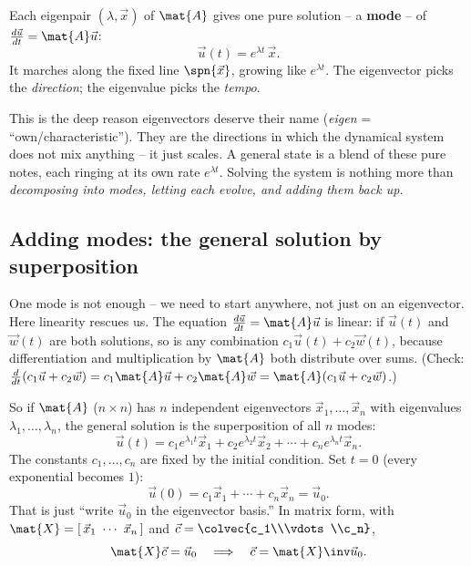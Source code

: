 \begin{focusbox}
Each eigenpair $(\lambda,\vec{x})$ of $\mat{A}$ gives one pure solution -- a
\textbf{mode} -- of $\frac{d\vec{u}}{dt}=\mat{A}\vec{u}$:
\[
  \vec{u}(t) = e^{\lambda t}\,\vec{x}.
\]
It marches along the fixed line $\spn\{\vec{x}\}$, growing like $e^{\lambda t}$.
The eigenvector picks the \emph{direction}; the eigenvalue picks the \emph{tempo}.
\end{focusbox}

\begin{intuitionbox}
This is the deep reason eigenvectors deserve their name (\emph{eigen} =
``own/characteristic''). They are the directions in which the dynamical system
does not mix anything -- it just scales. A general state is a blend of these pure
notes, each ringing at its own rate $e^{\lambda t}$. Solving the system is
nothing more than \emph{decomposing into modes, letting each evolve, and adding
them back up.}
\end{intuitionbox}

\subsection{Adding modes: the general solution by superposition}
\label{ch25:superposition}

One mode is not enough -- we need to start anywhere, not just on an eigenvector.
Here linearity rescues us. The equation $\frac{d\vec{u}}{dt} = \mat{A}\vec{u}$ is
linear: if $\vec{u}(t)$ and $\vec{w}(t)$ are both solutions, so is any combination
$c_1\vec{u}(t) + c_2\vec{w}(t)$, because differentiation and multiplication by
$\mat{A}$ both distribute over sums. (Check: $\frac{d}{dt}(c_1\vec{u}+c_2\vec{w})
= c_1\mat{A}\vec{u} + c_2\mat{A}\vec{w} = \mat{A}(c_1\vec{u}+c_2\vec{w})$.)

So if $\mat{A}$ ($n\times n$) has $n$ independent eigenvectors $\vec{x}_1,\dots,
\vec{x}_n$ with eigenvalues $\lambda_1,\dots,\lambda_n$, the general solution is
the superposition of all $n$ modes:
\[
  \boxed{\,
  \vec{u}(t) = c_1 e^{\lambda_1 t}\vec{x}_1
             + c_2 e^{\lambda_2 t}\vec{x}_2
             + \cdots
             + c_n e^{\lambda_n t}\vec{x}_n.
  \,}
\]
The constants $c_1,\dots,c_n$ are fixed by the initial condition. Set $t=0$
(every exponential becomes $1$):
\[
  \vec{u}(0) = c_1\vec{x}_1 + \cdots + c_n\vec{x}_n = \vec{u}_0.
\]
That is just ``write $\vec{u}_0$ in the eigenvector basis.'' In matrix form, with
$\mat{X} = [\,\vec{x}_1\ \cdots\ \vec{x}_n\,]$ and $\vec{c}=\colvec{c_1\\\vdots\\c_n}$,
\[
  \mat{X}\vec{c} = \vec{u}_0
  \quad\Longrightarrow\quad
  \vec{c} = \mat{X}\inv\vec{u}_0.
\]


